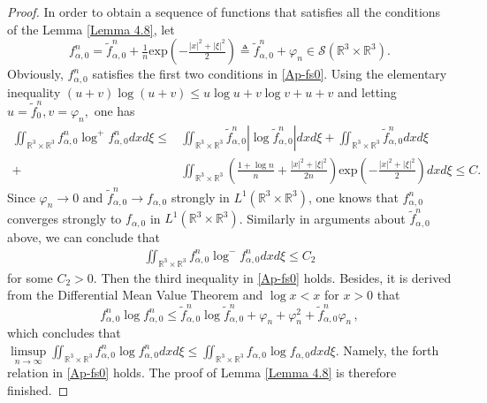 \documentclass[reqno,11pt]{amsart}
\numberwithin{equation}{section}
\def\no{\nonumber}
\def\R{\mathbb{R}}
\def\exp{\mathrm{exp}}
\begin{document}
\begin{proof}
In order to obtain a sequence of functions that satisfies all the conditions of the Lemma \ref{Lemma 4.8}, let
\begin{equation*}
	f^n_{\alpha,0 } = \tilde{f}^n_{\alpha,0 } + \tfrac{1}{n} \exp (-\tfrac{|x|^2 +|\xi|^2 } {2}) \triangleq \tilde{f}^n_{\alpha,0 } + \varphi_n \in \mathscr{S} (\R^3 \times \R^3 ) .
\end{equation*}
Obviously, $f^n_{\alpha,0 }$ satisfies the first two conditions in \eqref{Ap-fs0}. Using the elementary inequality $(u+v) \log (u+v ) \leq u \log u + v \log v + u+ v$ and letting $u=\tilde{f}^n_0, v =\varphi_n,$ one has
	\begin{align}\label{eq4.49}
		\no \iint_{\R^3 \times \R^3 } f^n_{\alpha,0 } \log ^+ f^n_{\alpha,0 } d x d \xi \leq & \iint_{\R^3 \times \R^3 } \tilde{f}^n_{\alpha,0 } | \log \tilde{f}^n_{\alpha,0 } | dxd\xi + \iint_{\R^3 \times \R^3 } \tilde{f}^n_{\alpha,0 } dxd\xi  \\
		+& \iint_{\R^3 \times \R^3 } (\tfrac{1+\log n}{n} +\tfrac{|x|^2 +|\xi|^2 } {2n} ) \exp (-\tfrac{|x|^2 +|\xi|^2 } {2}) dxd\xi \leq C .
	\end{align}
Since $\varphi_n \to 0 $ and $\tilde{f}^n_{\alpha,0 } \to f_{\alpha ,0}$ strongly in $L^1(\R^3\times \R^3)$, one knows that $ f^n_{\alpha ,0}$ converges strongly to $f_{\alpha ,0}$ in $L^1(\R^3\times \R^3)$. Similarly in arguments about $\tilde{f}^n_{\alpha,0 }$ above, we can conclude that 
\begin{equation*}
	\begin{aligned}
		\iint_{\R^3 \times \R^3 } f^n_{\alpha,0 } \log ^- f^n_{\alpha,0 } dxd\xi \leq C_2
	\end{aligned}
\end{equation*}
for some $C_2 > 0$. Then the third inequality in \eqref{Ap-fs0} holds. Besides, it is derived from the Differential Mean Value Theorem and $\log x < x$ for $x > 0$ that 
\begin{equation*}
	f^n_{\alpha,0 } \log f^n_{\alpha,0 } \leq \tilde{f}^n_{\alpha,0 } \log \tilde{f}^n_{\alpha,0 } +\varphi_n + \varphi_n ^2 +\tilde{f}^n_{\alpha,0 } \varphi_n \,,
\end{equation*}
which concludes that $ \limsup \limits_{n\rightarrow \infty }  \iint_{\R^3 \times \R^3 } f^n_{\alpha,0 } \log f^n_{\alpha,0 } dxd\xi \leq \iint_{\R^3 \times \R^3 } f_{\alpha,0 } \log f_{\alpha,0 } dxd\xi $. Namely, the forth relation in \eqref{Ap-fs0} holds. The proof of Lemma \ref{Lemma 4.8} is therefore finished.
\end{proof}
\end{document}
